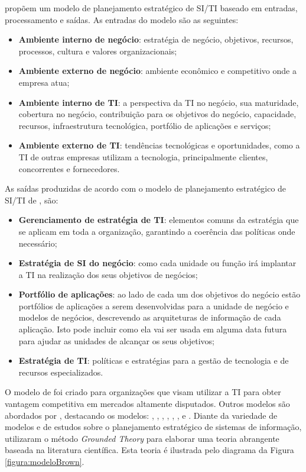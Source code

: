  propõem um modelo de planejamento estratégico de SI/TI baseado em entradas, processamento e saídas. As entradas do modelo são as seguintes:

\begin{itemize}
\item \textbf{Ambiente interno de negócio}: estratégia de negócio, objetivos, recursos, processos, cultura e valores organizacionais;
\item \textbf{Ambiente externo de negócio}: ambiente econômico e competitivo onde a empresa atua;
\item \textbf{Ambiente interno de TI}: a perspectiva da TI no negócio, sua maturidade, cobertura no negócio, contribuição para os objetivos do negócio, capacidade, recursos, infraestrutura tecnológica, portfólio de aplicações e serviços;
\item \textbf{Ambiente externo de TI}: tendências tecnológicas e oportunidades, como a TI de outras empresas utilizam a tecnologia, principalmente clientes, concorrentes e fornecedores.
\end{itemize}

As saídas produzidas de acordo com o modelo de planejamento estratégico de SI/TI de , são:
\begin{itemize}
\item \textbf{Gerenciamento de estratégia de TI}: elementos comuns da estratégia que se aplicam em toda a organização, garantindo a coerência das políticas onde necessário;
\item \textbf{Estratégia de SI do negócio}: como cada unidade ou função irá implantar a TI na realização dos seus objetivos de negócios;
\item \textbf{Portfólio de aplicações}: ao lado de cada um dos objetivos do negócio estão portfólios de aplicações a serem desenvolvidas para a unidade de negócio e modelos de negócios, descrevendo as arquiteturas de informação de cada aplicação. Isto pode incluir como ela vai ser usada em alguma data futura para ajudar as unidades de alcançar os seus objetivos;
\item \textbf{Estratégia de TI}: políticas e estratégias para a gestão de tecnologia e de recursos especializados.
\end{itemize}


O modelo de  foi criado para organizações que visam utilizar a TI para obter vantagem competitiva em mercados altamente disputados. Outros modelos são abordados por , destacando os modelos: \cite{nolan:73}, \cite{sullivan:85}, \cite{teo:97}, \cite{mentzas:97}, \cite{cassidy:98}, \cite{min:99}, \cite{gordon:06} e \cite{newkirk:07}. Diante da variedade de modelos e de estudos sobre o planejamento estratégico de sistemas de informação,  utilizaram o método \textit{Grounded Theory} para elaborar uma teoria abrangente baseada na literatura científica. Esta teoria é ilustrada pelo diagrama da Figura \ref{figura:modeloBrown}.

